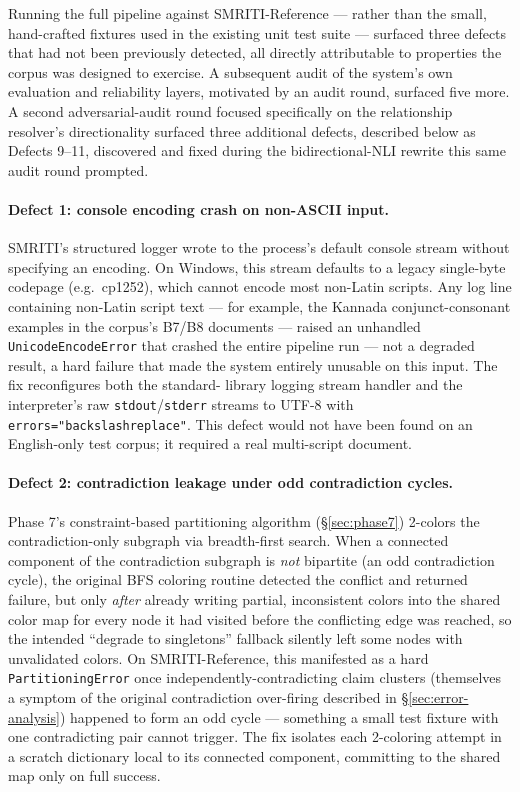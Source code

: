 Running the full pipeline against SMRITI-Reference --- rather than the
small, hand-crafted fixtures used in the existing unit test suite ---
surfaced three defects that had not been previously detected, all directly
attributable to properties the corpus was designed to exercise. A
subsequent audit of the system's own evaluation and reliability layers,
motivated by an audit round, surfaced five more. A second
adversarial-audit round focused specifically on the relationship
resolver's directionality surfaced three additional defects, described
below as Defects 9--11, discovered and fixed during the bidirectional-NLI
rewrite this same audit round prompted.

\paragraph{Defect 1: console encoding crash on non-ASCII input.} SMRITI's
structured logger wrote to the process's default console stream without
specifying an encoding. On Windows, this stream defaults to a legacy
single-byte codepage (e.g.\ cp1252), which cannot encode most non-Latin
scripts. Any log line containing non-Latin script text --- for example, the
Kannada conjunct-consonant examples in the corpus's B7/B8 documents ---
raised an unhandled \texttt{UnicodeEncodeError} that crashed the entire
pipeline run --- not a degraded result, a hard failure that made the system
entirely unusable on this input. The fix reconfigures both the standard-
library logging stream handler and the interpreter's raw
\texttt{stdout}/\texttt{stderr} streams to UTF-8 with
\texttt{errors="backslashreplace"}. This defect would not have been found
on an English-only test corpus; it required a real multi-script document.

\paragraph{Defect 2: contradiction leakage under odd contradiction
cycles.} Phase 7's constraint-based partitioning algorithm
(\S\ref{sec:phase7}) 2-colors the contradiction-only subgraph via
breadth-first search. When a connected component of the contradiction
subgraph is \emph{not} bipartite (an odd contradiction cycle), the original
BFS coloring routine detected the conflict and returned failure, but only
\emph{after} already writing partial, inconsistent colors into the shared
color map for every node it had visited before the conflicting edge was
reached, so the intended ``degrade to singletons'' fallback silently left
some nodes with unvalidated colors. On SMRITI-Reference, this manifested
as a hard \texttt{PartitioningError} once independently-contradicting
claim clusters (themselves a symptom of the original contradiction
over-firing described in \S\ref{sec:error-analysis}) happened to form an
odd cycle --- something a small test fixture with one contradicting pair
cannot trigger. The fix isolates each 2-coloring attempt in a scratch
dictionary local to its connected component, committing to the shared map
only on full success.

